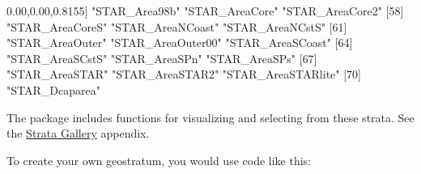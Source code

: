 \documentclass[
]{book}
\newenvironment{Shaded}{\begin{snugshade}}{\end{snugshade}}
\newcommand{\CommentTok}[1]{\textcolor[rgb]{0.56,0.35,0.01}{\textit{#1}}}
\newcommand{\DataTypeTok}[1]{\textcolor[rgb]{0.13,0.29,0.53}{#1}}
\newcommand{\DecValTok}[1]{\textcolor[rgb]{0.00,0.00,0.81}{#1}}
\newcommand{\KeywordTok}[1]{\textcolor[rgb]{0.13,0.29,0.53}{\textbf{#1}}}
\newcommand{\NormalTok}[1]{#1}
\newcommand{\OperatorTok}[1]{\textcolor[rgb]{0.81,0.36,0.00}{\textbf{#1}}}
\newcommand{\StringTok}[1]{\textcolor[rgb]{0.31,0.60,0.02}{#1}}
\begin{document}
\begin{Shaded}
\begin{Highlighting}[]
\NormalTok{[}\DecValTok{55}\NormalTok{] }\StringTok{"STAR_Area98b"}       \StringTok{"STAR_AreaCore"}      \StringTok{"STAR_AreaCore2"}    
\NormalTok{[}\DecValTok{58}\NormalTok{] }\StringTok{"STAR_AreaCoreS"}     \StringTok{"STAR_AreaNCoast"}    \StringTok{"STAR_AreaNCstS"}    
\NormalTok{[}\DecValTok{61}\NormalTok{] }\StringTok{"STAR_AreaOuter"}     \StringTok{"STAR_AreaOuter00"}   \StringTok{"STAR_AreaSCoast"}   
\NormalTok{[}\DecValTok{64}\NormalTok{] }\StringTok{"STAR_AreaSCstS"}     \StringTok{"STAR_AreaSPn"}       \StringTok{"STAR_AreaSPs"}      
\NormalTok{[}\DecValTok{67}\NormalTok{] }\StringTok{"STAR_AreaSTAR"}      \StringTok{"STAR_AreaSTAR2"}     \StringTok{"STAR_AreaSTARlite"} 
\NormalTok{[}\DecValTok{70}\NormalTok{] }\StringTok{"STAR_Dcaparea"}     
\end{Highlighting}
\end{Shaded}

The package includes functions for visualizing and selecting from these strata. See the \protect\hyperlink{stratagallery}{Strata Gallery} appendix.

To create your own geostratum, you would use code like this:

\begin{Shaded}
\end{Shaded}
\end{document}
